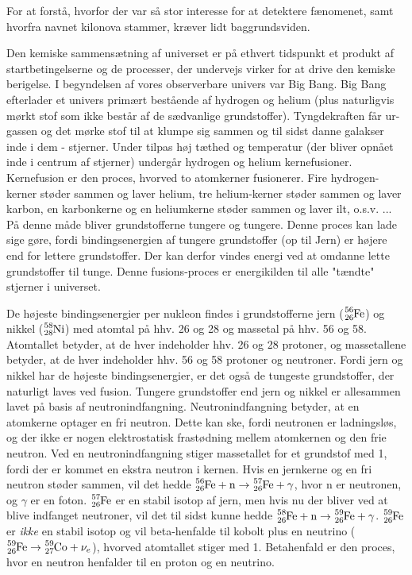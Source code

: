 \documentclass[twocolumn]{article}
\begin{document}
For at forstå, hvorfor der var så stor interesse for at detektere fænomenet, samt hvorfra navnet kilonova stammer, kræver lidt baggrundsviden.

Den kemiske sammensætning af universet er på ethvert tidspunkt et produkt af startbetingelserne og de processer, der undervejs virker for at drive den kemiske berigelse. I begyndelsen af vores observerbare univers var Big Bang. Big Bang efterlader et univers primært bestående af hydrogen og helium (plus naturligvis mørkt stof som ikke består af de sædvanlige grundstoffer). Tyngdekraften får ur-gassen og det mørke stof til at klumpe sig sammen og til sidst danne galakser inde i dem - stjerner. Under tilpas høj tæthed og temperatur (der bliver opnået inde i centrum af  stjerner) undergår hydrogen og helium kernefusioner. Kernefusion er den proces, hvorved to atomkerner fusionerer. Fire hydrogen-kerner støder sammen og laver helium, tre helium-kerner støder sammen og laver karbon, en karbonkerne og en heliumkerne støder sammen og laver ilt, o.s.v. ... På denne måde bliver grundstofferne tungere og tungere. Denne proces kan lade sige gøre, fordi bindingsenergien af tungere grundstoffer (op til Jern) er højere end for lettere grundstoffer. Der kan derfor vindes energi ved at omdanne lette grundstoffer til tunge. Denne fusions-proces er energikilden til alle "tændte" stjerner i universet.


De højeste bindingsenergier per nukleon findes i grundstofferne jern ($\ce{_{26}^{56}Fe}$) og nikkel ($\ce{_{28}^{58}Ni}$) med atomtal på hhv. 26 og 28 og massetal på hhv. 56 og 58. Atomtallet betyder, at de hver indeholder hhv. 26 og 28 protoner, og massetallene betyder, at de hver indeholder hhv. 56 og 58 protoner og neutroner. Fordi jern og nikkel har de højeste bindingsenergier, er det også de tungeste grundstoffer, der naturligt laves ved fusion. Tungere grundstoffer end jern og nikkel er allesammen lavet på basis af neutronindfangning. Neutronindfangning betyder, at en atomkerne optager en fri neutron. Dette kan ske, fordi neutronen er ladningsløs, og der ikke er nogen elektrostatisk frastødning mellem atomkernen og den frie neutron. Ved en neutronindfangning stiger massetallet for et grundstof med 1, fordi der er kommet en ekstra neutron i kernen. Hvis en jernkerne og en fri neutron støder sammen, vil det hedde $\ce{_{26}^{56}Fe} + \mathrm{n} \rightarrow \ce{_{26}^{57}Fe} + \gamma$, hvor n er neutronen, og $\gamma$ er en foton. $\ce{_{26}^{57}Fe}$ er en stabil isotop af jern, men hvis nu der bliver ved at blive indfanget neutroner, vil det til sidst kunne hedde $\ce{_{26}^{58}Fe} + \mathrm{n} \rightarrow \ce{_{26}^{59}Fe} + \gamma$. $\ce{_{26}^{59}Fe}$ er \textit{ikke} en stabil isotop og vil beta-henfalde til kobolt plus en neutrino ( $\ce{_{26}^{59}Fe} \rightarrow  \ce{_{27}^{59}Co} + \nu_e$), hvorved atomtallet stiger med 1. Betahenfald er den proces, hvor en neutron henfalder til en proton og en neutrino.
\end{document}
